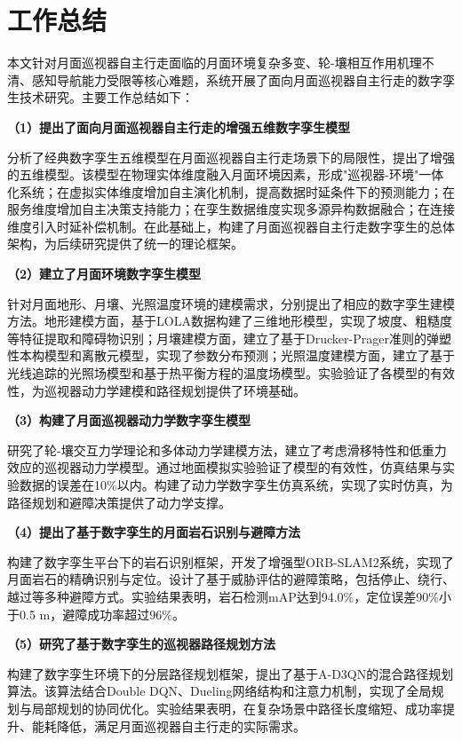 \section{工作总结}
\label{sec:summary}

本文针对月面巡视器自主行走面临的月面环境复杂多变、轮-壤相互作用机理不清、感知导航能力受限等核心难题，系统开展了面向月面巡视器自主行走的数字孪生技术研究。主要工作总结如下：

\textbf{（1）提出了面向月面巡视器自主行走的增强五维数字孪生模型}

分析了经典数字孪生五维模型在月面巡视器自主行走场景下的局限性，提出了增强的五维模型。该模型在物理实体维度融入月面环境因素，形成"巡视器-环境"一体化系统；在虚拟实体维度增加自主演化机制，提高数据时延条件下的预测能力；在服务维度增加自主决策支持能力；在孪生数据维度实现多源异构数据融合；在连接维度引入时延补偿机制。在此基础上，构建了月面巡视器自主行走数字孪生的总体架构，为后续研究提供了统一的理论框架。

\textbf{（2）建立了月面环境数字孪生模型}

针对月面地形、月壤、光照温度环境的建模需求，分别提出了相应的数字孪生建模方法。地形建模方面，基于LOLA数据构建了三维地形模型，实现了坡度、粗糙度等特征提取和障碍物识别；月壤建模方面，建立了基于Drucker-Prager准则的弹塑性本构模型和离散元模型，实现了参数分布预测；光照温度建模方面，建立了基于光线追踪的光照场模型和基于热平衡方程的温度场模型。实验验证了各模型的有效性，为巡视器动力学建模和路径规划提供了环境基础。

\textbf{（3）构建了月面巡视器动力学数字孪生模型}

研究了轮-壤交互力学理论和多体动力学建模方法，建立了考虑滑移特性和低重力效应的巡视器动力学模型。通过地面模拟实验验证了模型的有效性，仿真结果与实验数据的误差在10\%以内。构建了动力学数字孪生仿真系统，实现了实时仿真，为路径规划和避障决策提供了动力学支撑。

\textbf{（4）提出了基于数字孪生的月面岩石识别与避障方法}

构建了数字孪生平台下的岩石识别框架，开发了增强型ORB-SLAM2系统，实现了月面岩石的精确识别与定位。设计了基于威胁评估的避障策略，包括停止、绕行、越过等多种避障方式。实验结果表明，岩石检测mAP达到94.0\%，定位误差90\%小于0.5 m，避障成功率超过96\%。

\textbf{（5）研究了基于数字孪生的巡视器路径规划方法}

构建了数字孪生环境下的分层路径规划框架，提出了基于A-D3QN的混合路径规划算法。该算法结合Double DQN、Dueling网络结构和注意力机制，实现了全局规划与局部规划的协同优化。实验结果表明，在复杂场景中路径长度缩短、成功率提升、能耗降低，满足月面巡视器自主行走的实际需求。
